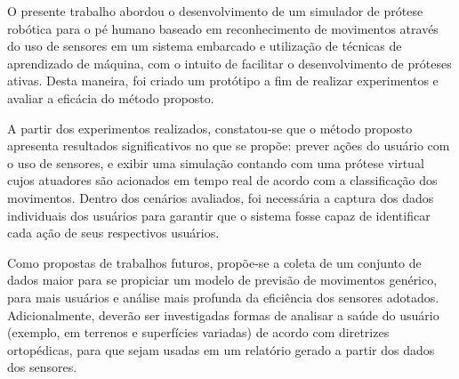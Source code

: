 O presente trabalho abordou o desenvolvimento de um simulador de prótese robótica para o pé humano baseado em reconhecimento de movimentos através do uso de sensores em um sistema embarcado e utilização de técnicas de aprendizado de máquina, com o intuito de facilitar o desenvolvimento de próteses ativas. Desta maneira, foi criado um protótipo a fim de realizar experimentos e avaliar a eficácia do método proposto.

A partir dos experimentos realizados, constatou-se que o método proposto apresenta resultados significativos no que se propõe: prever ações do usuário com o uso de sensores, e exibir uma simulação contando com uma prótese virtual cujos atuadores são acionados em tempo real de acordo com a classificação dos movimentos. Dentro dos cenários avaliados, foi necessária a captura dos dados individuais dos usuários para garantir que o sistema fosse capaz de identificar cada ação de seus respectivos usuários.

Como propostas de trabalhos futuros, propõe-se a coleta de um conjunto de dados maior para se propiciar um modelo de previsão de movimentos genérico, para mais usuários e análise mais profunda da eficiência dos sensores adotados. Adicionalmente, deverão ser investigadas formas de analisar a saúde do usuário (exemplo, em terrenos e superfícies variadas) de acordo com diretrizes ortopédicas, para que sejam usadas em um relatório gerado a partir dos dados dos sensores.
